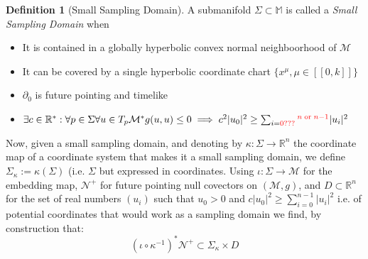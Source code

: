 \documentclass[a4paper,11pt]{article}
\numberwithin{equation}{section}
\theoremstyle{definition}
\newtheorem{definition}{Definition}
\newtheorem{comment}{Comment}
\begin{document}
\begin{definition}[Small Sampling Domain]
    A submanifold $\Sigma \subset \mathbb{M}$ is called a \emph{Small Sampling Domain} when
    \begin{itemize}
        \item It is contained in a globally hyperbolic convex normal neighboorhood of $\mathcal{M}$
        \item It can be covered by a single hyperbolic coordinate chart $\{x^\mu, \mu\in [\![0,k]\!]\}$
        \item  $\partial_0$ is future pointing and timelike
        \item $\exists c \in \mathbb{R}^* : \forall p \in \Sigma \forall u \in T_p\mathcal{M}^* g(u,u)\leq 0 \implies c^2|u_0|^2 \geq \sum_{i=\color{red}0???\color{black}}^{\color{red} n \; \mathrm{or} \; n-1\color{black}} |u_i|^2$
    \end{itemize}
\end{definition}

Now, given a small sampling domain, and denoting by $\kappa : \Sigma \to \mathbb{R}^n$ the coordinate map of a coordinate system that makes it a small sampling domain, we define $\Sigma_\kappa:=\kappa(\Sigma)$ (i.e. $\Sigma$ but expressed in coordinates. Using $\iota : \Sigma \to \mathcal{M}$ for the embedding map, $\mathcal{N}^+$ for future pointing null covectors on $(\mathcal{M},g)$, and $D\subset\mathbb{R}^n$ for the set of real numbers $(u_i)$ such that $u_0>0$ and $c |u_0|^2\geq \sum_{i=0}^{n-1} |u_i|^2$ i.e. of potential coordinates that would work as a sampling domain we find, by construction that:
$$\left(\iota\circ\kappa^{-1}\right)^*\mathcal{N}^+ \subset \Sigma_\kappa \times D$$
\end{document}
